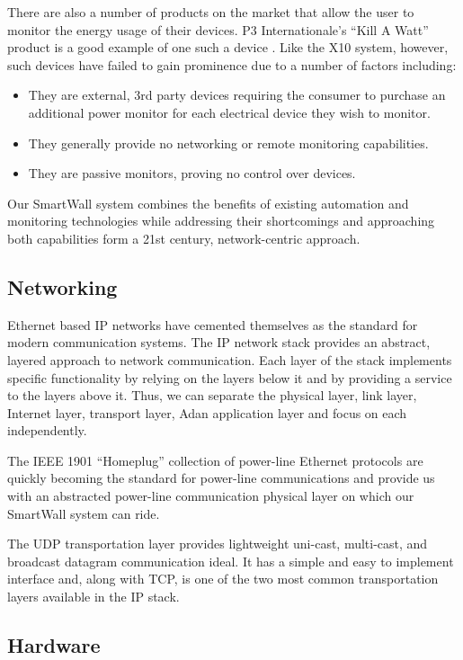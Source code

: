 \documentclass[12pt]{article}
\begin{document}
There are also a number of products on the market that allow the user
to monitor the energy usage of their devices. P3 Internationale's
``Kill A Watt'' product is a good example of one such a device
\cite{p3-KillAWatt}. Like the X10 system, however, such devices have
failed to gain prominence due to a number of factors including:
\begin{itemize}
  \setlength{\itemsep}{0pt}
  \setlength{\parskip}{0pt}
  \setlength{\parsep}{0pt}
\item They are external, 3rd party devices requiring the consumer to
  purchase an additional power monitor for each electrical device they
  wish to monitor. 
\item They generally provide no networking or remote monitoring capabilities.
\item They are passive monitors, proving no control over devices.
\end{itemize}  

Our SmartWall system combines the benefits of existing automation and
monitoring technologies while addressing their shortcomings and
approaching both capabilities form a 21st century, network-centric approach.

\subsection{Networking}
Ethernet based IP networks have cemented themselves as the standard
for modern communication systems. The IP network stack provides an
abstract, layered approach to network communication. Each layer of the
stack implements specific functionality by relying on the layers below
it and by providing a service to the layers above it. Thus, we can
separate the physical layer, link layer, Internet layer, transport
layer, Adan application layer and focus on each independently.

The IEEE 1901 ``Homeplug'' collection of power-line Ethernet protocols are
quickly becoming the standard for power-line communications and provide
us with an abstracted power-line communication physical layer on which our
SmartWall system can ride.

The UDP transportation layer provides lightweight uni-cast, multi-cast, and
broadcast datagram communication ideal. It has a simple and easy to
implement interface and, along with TCP, is one of the two most common
transportation layers available in the IP stack.

\subsection{Hardware}
\end{document}
